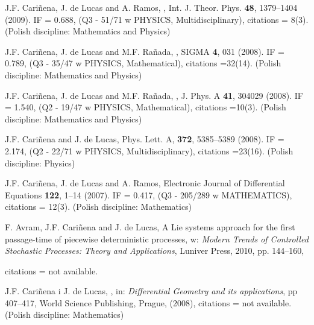 \documentclass[12pt,reqno]{amsbook}
\begin{document}
\begin{enumerate}
\item J.F. Cari\~nena, J. de Lucas and A. Ramos,
\color{blue}{\it A geometric approach to time evolution operators of Lie quantum systems}\color{black}, Int. J. Theor. Phys. {\bf 48}, 1379--1404 (2009). IF = 0.688, (Q3 - 51/71 w PHYSICS, Multidisciplinary), citations = 8(3). (Polish discipline: Mathematics and Physics)

\item J.F. Cari\~nena, J. de Lucas and M.F. Ra\~nada,
\color{blue}{\it Recent Applications of the Theory of Lie Systems in Ermakov Systems}\color{black}, SIGMA {\bf 4}, 031  (2008). IF = 0.789, (Q3 - 35/47 w PHYSICS, Mathematical), citations =32(14). (Polish discipline: Mathematics and Physics)

\item J.F. Cari\~nena, J. de Lucas and M.F. Ra\~nada,
\color{blue}{\it Integrability of Lie systems and some of its applications in physics}\color{black}, J. Phys. A {\bf 41}, 304029 (2008). IF = 1.540, (Q2 - 19/47 w PHYSICS, Mathematical), citations =10(3). (Polish discipline: Mathematics and Physics)

\item J.F. Cari\~nena and J. de Lucas,
\color{blue}{\it A nonlinear superposition rule for solutions of the Milne--Pinney equation, }\color{black} Phys. Lett. A, {\bf 372}, 5385--5389 (2008). IF = 2.174, (Q2 - 22/71 w PHYSICS, Multidisciplinary), citations =23(16). (Polish discipline: Physics)


\item J.F. Cari\~nena, J. de Lucas and A. Ramos,
\color{blue}{\it A geometric approach to integrability conditions for Riccati equations,} \color{black} Electronic Journal of Differential Equations {\bf 122}, 1--14 (2007). IF = 0.417, (Q3 - 205/289 w MATHEMATICS), citations = 12(3). (Polish discipline: Mathematics)




{ \item F. Avram, J.F. Cari\~nena and J. de Lucas, \color{blue} A Lie systems approach for the first passage-time of piecewise deterministic processes\color{black}, w: {\sl Modern Trends of Controlled Stochastic Processes: Theory and Applications}, Luniver Press, 2010, pp. 144--160,} citations = not available.

\item  J.F. Cari\~nena i J. de Lucas,
\color{blue}{\it Lie systems and integrability conditions of differential equations and some of its applications}\color{black}, in: {\sl Differential Geometry and its applications}, pp 407--417, World Science Publishing, Prague, (2008), citations = not available. (Polish discipline: Mathematics)



\end{enumerate}
\end{document}
